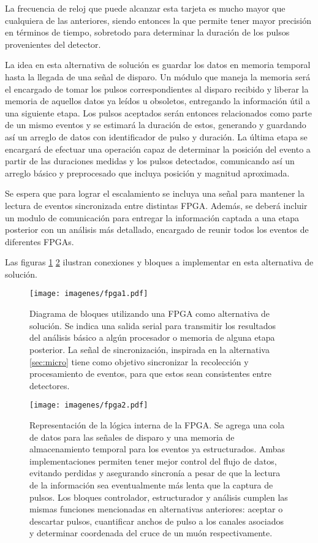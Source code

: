 La frecuencia de reloj que puede alcanzar esta tarjeta es mucho mayor que cualquiera de las anteriores, siendo entonces la que permite tener mayor precisión en términos de tiempo, sobretodo para determinar la duración de los pulsos provenientes del detector.

La idea en esta alternativa de solución es guardar los datos en memoria temporal hasta la llegada de una señal de disparo. Un módulo que maneja la memoria será el encargado de tomar los pulsos correspondientes al disparo recibido y liberar la memoria de aquellos datos ya leídos u obsoletos, entregando la información útil a una siguiente etapa. Los pulsos aceptados serán entonces relacionados como parte de un mismo eventos y se estimará la duración de estos, generando y guardando así un arreglo de datos con identificador de pulso y duración. La última etapa se encargará de efectuar una operación capaz de determinar la posición del evento a partir de las duraciones medidas y los pulsos detectados, comunicando así un arreglo básico y preprocesado que incluya posición y magnitud aproximada.

\par Se espera que para lograr el escalamiento se incluya una señal para mantener la lectura de eventos sincronizada entre distintas FPGA. Además, se deberá incluir un modulo de comunicación para entregar la información captada a una etapa posterior con un análisis más detallado, encargado de reunir todos los eventos de diferentes FPGAs.

\newpage
\par Las figuras \ref{fig:fpga1} \ref{fig:fpga2} ilustran conexiones y bloques a implementar en esta alternativa de solución.

\begin{figure}[H]
	\centering
	\texttt{[image: imagenes/fpga1.pdf]}
	\caption{Diagrama de bloques utilizando una FPGA como alternativa de solución. Se indica una salida serial para transmitir los resultados del análisis básico a algún procesador o memoria de alguna etapa posterior. La señal de sincronización, inspirada en la alternativa \ref{sec:micro} tiene como objetivo sincronizar la recolección y procesamiento de eventos, para que estos sean consistentes entre detectores.}
	\label{fig:fpga1}
\end{figure}

\begin{figure}[H]
	\centering
	\texttt{[image: imagenes/fpga2.pdf]}
	\caption{Representación de la lógica interna de la FPGA. Se agrega una cola de datos para las señales de disparo y una memoria de almacenamiento temporal para los eventos ya estructurados. Ambas implementaciones permiten tener mejor control del flujo de datos, evitando perdidas y asegurando sincronía a pesar de que la lectura de la información sea eventualmente más lenta que la captura de pulsos. Los bloques controlador, estructurador y análisis cumplen las mismas funciones mencionadas en alternativas anteriores: aceptar o descartar pulsos, cuantificar anchos de pulso a  los canales asociados y determinar coordenada del cruce de un muón respectivamente.}
	\label{fig:fpga2}
\end{figure}

